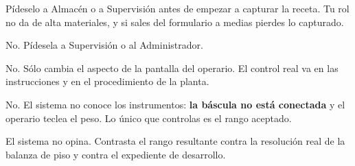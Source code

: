 Pídeselo a Almacén o a Supervisión antes de empezar a capturar la receta. Tu rol no da
de alta materiales, y si sales del formulario a medias pierdes lo capturado.

No. Pídesela a Supervisión o al Administrador.

No. Sólo cambia el aspecto de la pantalla del operario. El control real va en las
instrucciones y en el procedimiento de la planta.

No. El sistema no conoce los instrumentos: \textbf{la báscula no está conectada} y el
operario teclea el peso. Lo único que controlas es el rango aceptado.

El sistema no opina. Contrasta el rango resultante contra la resolución real de la
balanza de piso y contra el expediente de desarrollo.
